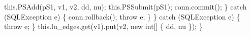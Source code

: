       this.PSAdd(pS1, v1, v2, dd, nu);
      this.PSSubmit(pS1);
      conn.commit();
    \} catch (SQLException e) \{
      conn.rollback();
      throw e;
    \}
  \} catch (SQLException e) \{
    throw e;
  \}
  this.lu_edges.get(v1).put(v2, new int[] \{ dd, nu \});
\}
\eatline
{}\nwendcode{}

\nwdocspar
